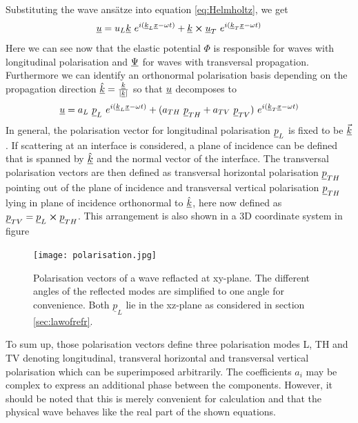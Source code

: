 Substituting the wave ansätze into equation \ref{eq:Helmholtz}, we get
\begin{equation}
    \uline{u} = u_L \uline{k}\	e^{i(\uline{k}_L\uline{x}-\omega t)}
    + \uline{k} \cross \uline{u}_T\ e^{i(\uline{k}_T\uline{x}-\omega t)}
\end{equation}
Here we can see now that the elastic potential $\Phi$ is responsible for waves
with longitudinal polarisation and $\underline{\Psi}$ for waves with transversal
propagation. Furthermore we can identify an orthonormal polarisation basis
depending on the propagation direction $\underline{\hat{k}} =
    \frac{\underline{k}}{|\underline{k}|}$ so that $\underline{u}$ decomposes to
\begin{equation} \label{eq:wave_ansatz}
    \uline{u} = a_L \ \uline{p}_L\	e^{i(\uline{k}_L\uline{x}-\omega
            t)}
    + (a_{TH}\ \uline{p}_{TH} + a_{TV}\ \uline{p}_{TV})\
    e^{i(\uline{k}_T\uline{x}-\omega t)}
\end{equation}
In general, the polarisation vector for longitudinal polarisation
$\underline{p}_L$ is fixed to be $\underline{\vec{k}}$. If scattering at an interface
is considered, a plane of incidence can be defined that is spanned by
$\underline{\hat{k}}$ and the normal vector of the interface. The transversal
polarisation vectors are then defined as transversal horizontal polarisation
$\underline{p}_{TH}$ pointing out of the plane of incidence and transversal
vertical polarisation $\underline{p}_{TH}$ lying in plane of incidence orthonormal
to $\underline{\hat{k}}$, here now defined as
$\underline{p}_{TV}=\underline{p}_L \cross \underline{p}_{TH}$. This arrangement is also
shown in a 3D coordinate system in figure 

\begin{figure}[t]
    \centering
    \texttt{[image: polarisation.jpg]}
    \caption{Polarisation vectors of a wave reflacted at xy-plane.  The different 
    angles of the reflected modes are simplified to one angle for convenience. 
    Both $\underline{p}_L$ lie in the xz-plane as considered in section 
    \ref{sec:lawofrefr}.}
    \label{fig:polarisations}
\end{figure}


To sum up, those polarisation vectors define three polarisation modes L, TH and
TV denoting longitudinal, transveral horizontal and transversal vertical
polarisation which can be superimposed arbitrarily. The coefficients $a_i$ may
be complex to express an additional phase between the components. However, it
should be noted that this is merely convenient for
calculation and that the physical wave behaves like the real part of the shown
equations.

